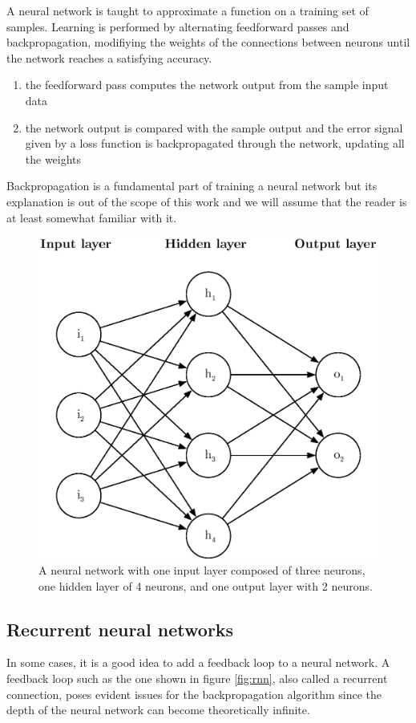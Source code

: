 A neural network is taught to approximate a function on a training
set of samples. Learning is performed by alternating feedforward passes and 
backpropagation, modifiying the weights of the connections between neurons until
the network reaches a satisfying accuracy.

\begin{enumerate}
	\item the feedforward pass computes the network output from the sample
		input data
	\item the network output is compared with the sample output and the
		error signal given by a loss function
		is backpropagated through the network, updating
		all the weights
\end{enumerate}

Backpropagation is a fundamental part of training a neural network but its
explanation is out of the scope of this work and we will assume that the
reader is at least somewhat familiar with it.

\begin{figure}[]
	\centering
	\includegraphics[width=0.6\linewidth]{fig/neural_network.eps}
	\caption{A neural network with one input layer composed of three neurons,
	one hidden layer of 4 neurons, and one output layer with 2 neurons.}
	\label{fig:neural_network}
\end{figure}


\subsection{Recurrent neural networks}
In some cases, it is a good idea to add a feedback loop to a neural network. 
A feedback loop such as the one shown in figure \ref{fig:rnn}, also called
a recurrent connection, poses evident issues for the backpropagation algorithm
since the depth of the neural network can become theoretically infinite.\\

